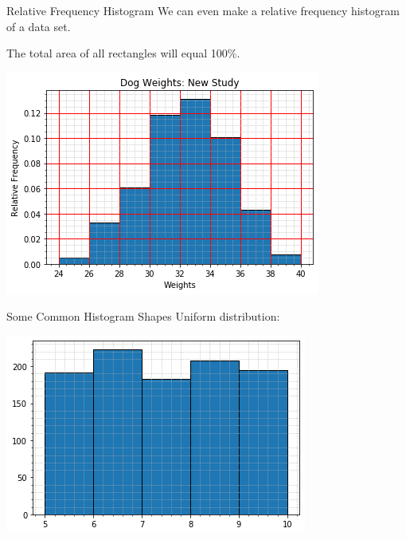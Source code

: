 \documentclass[t]{beamer}
\begin{document}
\begin{frame}{Relative Frequency Histogram}
We can even make a relative frequency histogram of a data set.	\newline\\	\pause

The total area of all rectangles will equal 100\%.	\newline\\	\pause
\begin{center}
\includegraphics[scale=0.55]{../Images/dog_weights_relfreq_hist.png}
\end{center}
\end{frame}

\begin{frame}{Some Common Histogram Shapes}
Uniform distribution:	\newline\\
\begin{center}
\includegraphics[scale=0.55]{../Images/uniform.png}
\end{center}
\end{frame}
\end{document}
